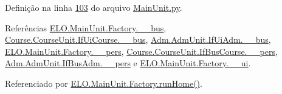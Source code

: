 Definição na linha \hyperlink{MainUnit_8py_source_l00103}{103} do arquivo \hyperlink{MainUnit_8py_source}{Main\-Unit.\-py}.



Referências \hyperlink{MainUnit_8py_source_l00041}{E\-L\-O.\-Main\-Unit.\-Factory.\-\_\-\-\_\-bus}, \hyperlink{CourseUnit_8py_source_l00056}{Course.\-Course\-Unit.\-If\-Ui\-Course.\-\_\-\-\_\-bus}, \hyperlink{AdmUnit_8py_source_l00067}{Adm.\-Adm\-Unit.\-If\-Ui\-Adm.\-\_\-\-\_\-bus}, \hyperlink{MainUnit_8py_source_l00042}{E\-L\-O.\-Main\-Unit.\-Factory.\-\_\-\-\_\-pers}, \hyperlink{CourseUnit_8py_source_l00100}{Course.\-Course\-Unit.\-If\-Bus\-Course.\-\_\-\-\_\-pers}, \hyperlink{AdmUnit_8py_source_l00112}{Adm.\-Adm\-Unit.\-If\-Bus\-Adm.\-\_\-\-\_\-pers} e \hyperlink{MainUnit_8py_source_l00040}{E\-L\-O.\-Main\-Unit.\-Factory.\-\_\-\-\_\-ui}.



Referenciado por \hyperlink{classELO_1_1MainUnit_1_1Factory_a766943202ba781821cf749ca0fb133ba}{E\-L\-O.\-Main\-Unit.\-Factory.\-run\-Home()}.



